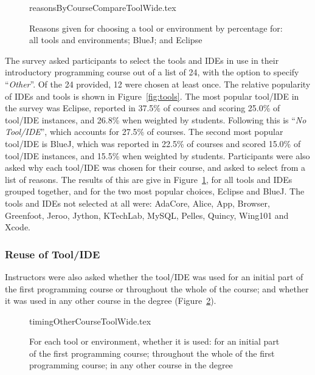 \documentclass[english]{programming}
\begin{document}
\begin{figure}
\begin{center}
{reasonsByCourseCompareToolWide.tex}
\end{center}
\caption{Reasons given for choosing a tool or environment by percentage for: all tools and environments; BlueJ; and Eclipse\label{fig:reasonsTools}}
\end{figure}

The survey asked participants to select the tools and IDEs in use in
their introductory programming course out of a list of 24, with the
option to specify ``{\emph{Other}}''. Of the 24 provided, 12 were
chosen at least once. The relative popularity of IDEs and tools is
shown in Figure~\ref{fig:tools}. The most popular tool/IDE in the
survey was Eclipse, reported in 37.5\% of courses and scoring 25.0\%
of tool/IDE instances, and 26.8\% when weighted by students. Following
this is ``{\emph{No Tool/IDE}}'', which accounts for 27.5\% of
courses. The second most popular tool/IDE is BlueJ, which was reported
in 22.5\% of courses and scored 15.0\% of tool/IDE instances, and
15.5\% when weighted by students. Participants were also asked why
each tool/IDE was chosen for their course, and asked to select from a
list of reasons. The results of this are give in
Figure~\ref{fig:reasonsTools}, for all tools and IDEs grouped
together, and for the two most popular choices, Eclipse and BlueJ. The
tools and IDEs not selected at all were: AdaCore, Alice, App, Browser,
Greenfoot, Jeroo, Jython, KTechLab, MySQL, Pelles, Quincy, Wing101 and
Xcode.

\subsubsection{Reuse of Tool/IDE}

Instructors were also asked whether the tool/IDE was used for an
initial part of the first programming course or throughout the whole
of the course; and whether it was used in any other course in the
degree (Figure~\ref{fig:toolreuse}). 

\begin{figure}
\begin{center}
{timingOtherCourseToolWide.tex}
\end{center}
\caption{For each tool or environment, whether it is used: for an initial part of the first programming course; throughout the whole of the first programming course; in any other course in the degree\label{fig:toolreuse}}
\end{figure}
\end{document}

